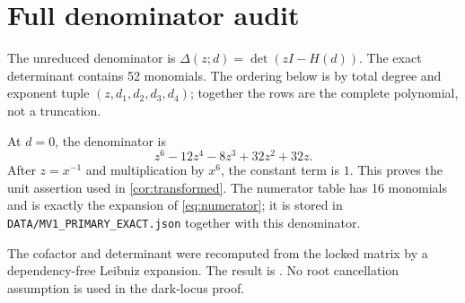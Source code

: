 \section{Full denominator audit}\label{app:denominator}

The unreduced denominator is
\(\Delta(z;d)=\det(zI-H(d))\).  The exact determinant contains 52 monomials.
The ordering below is by total degree and exponent tuple
\((z,d_1,d_2,d_3,d_4)\); together the rows are the complete polynomial, not a
truncation.



At \(d=0\), the denominator is
\[
z^6-12z^4-8z^3+32z^2+32z.
\]
After \(z=x^{-1}\) and multiplication by \(x^6\), the constant term is \(1\).
This proves the unit assertion used in \cref{cor:transformed}.  The numerator
table has 16 monomials and is exactly the expansion of \cref{eq:numerator}; it
is stored in \texttt{DATA/MV1\_PRIMARY\_EXACT.json} together with this
denominator.

The cofactor and determinant were recomputed from the locked matrix by a
dependency-free Leibniz expansion.  The result is
.  No root cancellation assumption is used in the
dark-locus proof.
